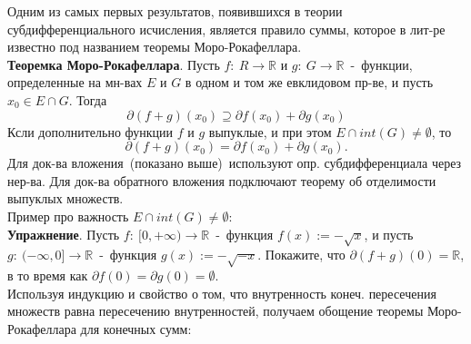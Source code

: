 Одним из самых первых результатов, появившихся в теории субдифференциального исчисления, является правило суммы, которое в лит-ре известно под названием теоремы Моро-Рокафеллара.\\

\textbf{Теоремка Моро-Рокафеллара}. Пусть $f:~R \to \mathbb{R}$ и $g:~G \to \mathbb{R}$~-~функции, определенные на мн-вах $E$ и $G$ в одном и том же евклидовом пр-ве, и пусть $x_0 \in E \cap G$. Тогда
$$
\partial (f + g)(x_0) \supseteq \partial f(x_0)+\partial g(x_0)
$$
Ксли дополнительно функции $f$ и $g$ выпуклые, и при этом $E \cap int (G) \neq \emptyset$, то
$$
\partial (f+g)(x_0)=\partial f(x_0)+\partial g(x_0).
$$
Для док-ва вложения~(показано выше)~используют опр. субдифференциала через нер-ва. Для док-ва обратного вложения подключают теорему об отделимости выпуклых множеств.\\

Пример про важность $E \cap int(G) \neq \emptyset$:\\

\textbf{Упражнение}. Пусть $f:~[0,+\infty) \to \mathbb{R}$~-~функция $f(x):=-\sqrt{x}$, и пусть $g:~(-\infty,0] \to \mathbb{R}$~-~функция $g(x):=-\sqrt{-x}$. Покажите, что $\partial(f+g)(0)=\mathbb{R}$, в то время как $\partial f(0)=\partial g(0)=\emptyset$.\\

Используя индукцию и свойство о том, что внутренность конеч. пересечения множеств равна пересечению внутренностей, получаем обощение теоремы Моро-Рокафеллара для конечных сумм:\\

